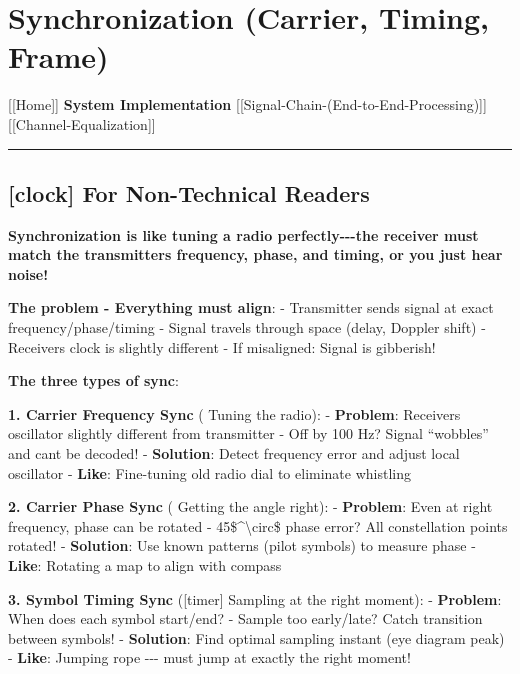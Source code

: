 \section{Synchronization (Carrier, Timing,
Frame)}\label{synchronization-carrier-timing-frame}

{[}{[}Home{]}{]} \textbar{} \textbf{System Implementation} \textbar{}
{[}{[}Signal-Chain-(End-to-End-Processing){]}{]} \textbar{}
{[}{[}Channel-Equalization{]}{]}

\begin{center}\rule{0.5\linewidth}{0.5pt}\end{center}

\subsection{{[}clock{]} For Non-Technical
Readers}\label{for-non-technical-readers}

\textbf{Synchronization is like tuning a radio perfectly-\/-\/-the
receiver must match the transmitter\textquotesingle s frequency, phase,
and timing, or you just hear noise!}

\textbf{The problem - Everything must align}: - Transmitter sends signal
at exact frequency/phase/timing - Signal travels through space (delay,
Doppler shift) - Receiver\textquotesingle s clock is slightly different
- If misaligned: Signal is gibberish!

\textbf{The three types of sync}:

\textbf{1. Carrier Frequency Sync} ( Tuning the radio): -
\textbf{Problem}: Receiver\textquotesingle s oscillator slightly
different from transmitter - Off by 100 Hz? Signal ``wobbles'' and
can\textquotesingle t be decoded! - \textbf{Solution}: Detect frequency
error and adjust local oscillator - \textbf{Like}: Fine-tuning old radio
dial to eliminate whistling

\textbf{2. Carrier Phase Sync} ( Getting the angle right): -
\textbf{Problem}: Even at right frequency, phase can be rotated -
45\$\^{}\textbackslash circ\$ phase error? All constellation points
rotated! - \textbf{Solution}: Use known patterns (pilot symbols) to
measure phase - \textbf{Like}: Rotating a map to align with compass

\textbf{3. Symbol Timing Sync} ({[}timer{]} Sampling at the right
moment): - \textbf{Problem}: When does each symbol start/end? - Sample
too early/late? Catch transition between symbols! - \textbf{Solution}:
Find optimal sampling instant (eye diagram peak) - \textbf{Like}:
Jumping rope -\/-\/- must jump at exactly the right moment!

